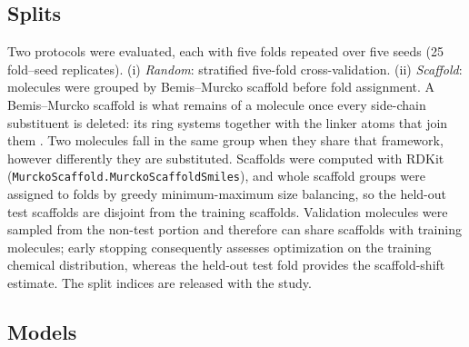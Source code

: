 \documentclass[11pt,a4paper]{article}
\begin{document}
\subsection{Splits}

Two protocols were evaluated, each with five folds repeated over five seeds (\num{25} fold--seed replicates). (i) \emph{Random}: stratified five-fold cross-validation. (ii) \emph{Scaffold}: molecules were grouped by Bemis--Murcko scaffold before fold assignment. A Bemis--Murcko scaffold is what remains of a molecule once every side-chain substituent is deleted: its ring systems together with the linker atoms that join them \citep{bemis_murcko_1996}. Two molecules fall in the same group when they share that framework, however differently they are substituted. Scaffolds were computed with RDKit (\texttt{MurckoScaffold.MurckoScaffoldSmiles}), and whole scaffold groups were assigned to folds by greedy minimum-maximum size balancing, so the held-out test scaffolds are disjoint from the training scaffolds. Validation molecules were sampled from the non-test portion and therefore can share scaffolds with training molecules; early stopping consequently assesses optimization on the training chemical distribution, whereas the held-out test fold provides the scaffold-shift estimate. The split indices are released with the study.

\subsection{Models}
\end{document}
